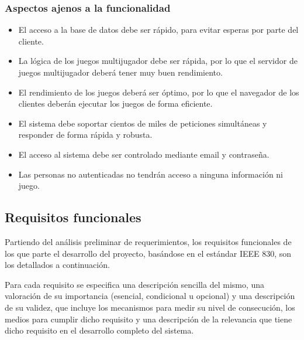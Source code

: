 \subsubsection{Aspectos ajenos a la funcionalidad}

\begin{itemize}
\item El acceso a la base de datos debe ser rápido, para evitar esperas por parte del cliente.
\item La lógica de los juegos multijugador debe ser rápida, por lo que el servidor de juegos multijugador deberá tener muy buen rendimiento.
\item El rendimiento de los juegos deberá ser óptimo, por lo que el navegador de los clientes deberán ejecutar los juegos de forma eficiente.
\item El sistema debe soportar cientos de miles de peticiones simultáneas y responder de forma rápida y robusta.
\item El acceso al sistema debe ser controlado mediante email y contraseña.
\item Las personas no autenticadas no tendrán acceso a ninguna información ni juego.
\end{itemize}


\subsection{Requisitos funcionales}

Partiendo del análisis preliminar de requerimientos, los requisitos funcionales de los que parte el desarrollo del proyecto, basándose en el estándar IEEE 830, son los detallados a continuación. 

Para cada requisito se especifica una descripción sencilla del mismo, una valoración de su importancia (esencial, condicional u opcional) y una descripción de su validez, que incluye los mecanismos para medir su nivel de consecución, los medios para cumplir dicho requisito y una descripción de la relevancia que tiene dicho requisito en el desarrollo completo del sistema.

\renewcommand{\labelenumi}{\bf RF-\arabic{enumi}}

